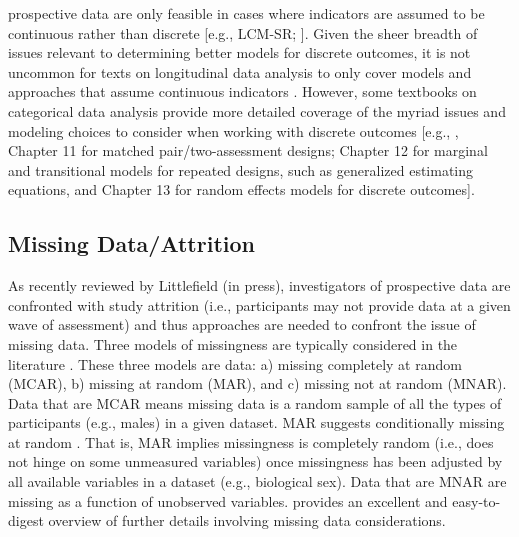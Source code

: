 \documentclass[
  10pt,
  letterpaper,
]{article}
\begin{document}
prospective data are only feasible in cases where indicators are assumed
to be continuous rather than discrete {[}e.g., LCM-SR;
\citet{curran2014a}{]}. Given the sheer breadth of issues relevant to
determining better models for discrete outcomes, it is not uncommon for
texts on longitudinal data analysis to only cover models and approaches
that assume continuous indicators \citep[e.g.,][]{little2013}. However,
some textbooks on categorical data analysis provide more detailed
coverage of the myriad issues and modeling choices to consider when
working with discrete outcomes {[}e.g., \citet{lenz2016}, Chapter 11 for
matched pair/two-assessment designs; Chapter 12 for marginal and
transitional models for repeated designs, such as generalized estimating
equations, and Chapter 13 for random effects models for discrete
outcomes{]}.

\hypertarget{missing-dataattrition}{%
\subsection{Missing Data/Attrition}\label{missing-dataattrition}}

As recently reviewed by Littlefield (in press), investigators of
prospective data are confronted with study attrition (i.e., participants
may not provide data at a given wave of assessment) and thus approaches
are needed to confront the issue of missing data. Three models of
missingness are typically considered in the literature
\citep[see][]{little1989}. These three models are data: a) missing
completely at random (MCAR), b) missing at random (MAR), and c) missing
not at random (MNAR). Data that are MCAR means missing data is a random
sample of all the types of participants (e.g., males) in a given
dataset. MAR suggests conditionally missing at random
\citep[see][]{graham2009}. That is, MAR implies missingness is
completely random (i.e., does not hinge on some unmeasured variables)
once missingness has been adjusted by all available variables in a
dataset (e.g., biological sex). Data that are MNAR are missing as a
function of unobserved variables. \citet{graham2009} provides an
excellent and easy-to-digest overview of further details involving
missing data considerations.
\end{document}
